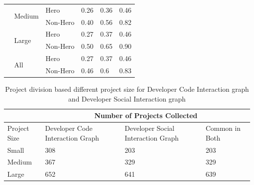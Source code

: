 \documentclass[sigconf,review]{acmart}
\begin{document}
\begin{table}[!t]
{\begin{center}
\begin{tabular}{|l|l|l|l|l|l|}
                                    & \multirow{2}{*}{Medium} & Hero     & 0.26      & 0.36     & 0.46     \\ \cline{3-6} 
                                    &                         & Non-Hero & 0.40      & 0.56     & 0.82     \\ \cline{2-6} 
                                    & \multirow{2}{*}{Large}  & Hero     & 0.27      & 0.37     & 0.46     \\ \cline{3-6} 
                                    &                         & Non-Hero & 0.50      & 0.65     & 0.90     \\ \cline{2-6} 
                                    & \multirow{2}{*}{All}    & Hero     & 0.27      & 0.37     & 0.46     \\ \cline{3-6} 
                                    &                         & Non-Hero & 0.46      & 0.6      & 0.83     \\ \hline
\end{tabular}

\end{center}}
\end{table}

\begin{table}[!t]
\centering
\label{table:project size}
\caption{Project division based different project size for Developer Code Interaction graph and Developer Social Interaction graph}
{\scriptsize
\begin{center}
\begin{tabular}{|p{1cm}|p{2.2cm}|p{2.2cm}|p{1.5cm}|}\hline
\multicolumn{1}{|l|}{} & \multicolumn{3}{|c|}{Number of Projects Collected}                      \\\hline
Project Size         & Developer Code Interaction Graph & Developer Social Interaction Graph & Common in Both  \\\hline
Small                & 308                              & 203            &     203                \\\hline
Medium               & 367                              & 329            &     329               \\\hline
Large                & 652                              & 641            &     639              \\\hline 
\end{tabular}
\end{center}}
\end{table}
\end{document}

